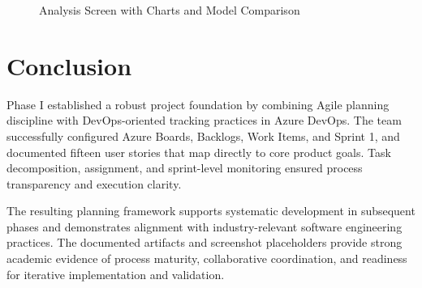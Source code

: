 \documentclass[12pt,a4paper]{article}
\begin{document}
\begin{figure}[H]
\centering
{}
\caption{Analysis Screen with Charts and Model Comparison}
\end{figure}

\section{Conclusion}
Phase I established a robust project foundation by combining Agile planning discipline with DevOps-oriented tracking practices in Azure DevOps. The team successfully configured Azure Boards, Backlogs, Work Items, and Sprint 1, and documented fifteen user stories that map directly to core product goals. Task decomposition, assignment, and sprint-level monitoring ensured process transparency and execution clarity.

The resulting planning framework supports systematic development in subsequent phases and demonstrates alignment with industry-relevant software engineering practices. The documented artifacts and screenshot placeholders provide strong academic evidence of process maturity, collaborative coordination, and readiness for iterative implementation and validation.
\end{document}
